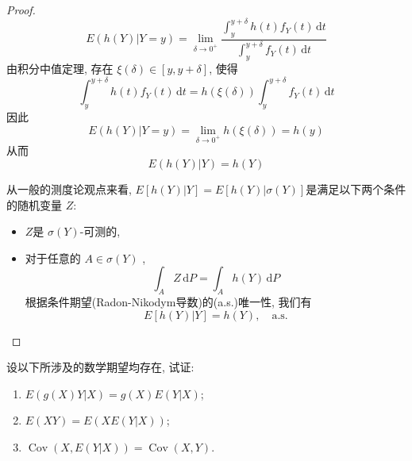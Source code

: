 \documentclass[../main.tex]{subfiles}
\begin{document}
\begin{proof}
  

  \[
  E\left( h\left( Y \right)|Y= y  \right)= \lim_{ \delta \to 0^{+ }} \frac{\int_{y}^{y+  \delta }h\left( t \right)f_{Y}\left( t \right)\,\mathrm{d} t   }{ \int_{y}^{y+  \delta }f_{Y}\left( t \right)\,\mathrm{d} t }  
  \]由积分中值定理, 存在 \(   \xi \left(  \delta \right) \in [y,y+  \delta ]  \), 使得 \[
  \int_{y}^{y+  \delta }h\left( t \right)f_{Y}\left( t \right)\,\mathrm{d} t= h\left(  \xi \left(  \delta  \right)  \right) \int_{y}^{y+  \delta }   f_{Y}\left( t \right)\,\mathrm{d} t 
  \] 因此 \[
  E\left( h\left( Y \right)|Y = y \right)= \lim_{ \delta \to 0^{+ }} h\left(  \xi \left(  \delta  \right)  \right)= h\left( y \right)  
  \]从而 \[
  E\left( h\left( Y \right)|Y  \right)= h\left( Y \right)  
  \]

  \begin{remark}
    从一般的测度论观点来看,  \(  E[h\left( Y \right)| Y ]= E[h\left( Y \right)| \sigma \left( Y \right)  ]  \)是满足以下两个条件的随机变量 \(  Z  \):
     \begin{itemize}
          \item \(  Z  \)是 \(   \sigma \left( Y \right)   \)-可测的, 
          \item  对于任意的 \(  A\in  \sigma \left( Y \right)   \)   , \[
          \int_{A}Z\,\mathrm{d} P= \int_{A}h\left( Y \right)\,\mathrm{d} P 
          \]根据条件期望(Radon-Nikodym导数)的(a.s.)唯一性, 我们有 \[
          E[h\left( Y \right)|Y ]= h\left( Y \right),\quad \text{a.s.} 
          \]
     \end{itemize}
       
  \end{remark}
\end{proof}

\begin{exercise}{}{}
设以下所涉及的数学期望均存在, 试证:
\begin{enumerate}
\item $E(g(X)Y|X) = g(X)E(Y|X)$;
\item $E(XY) = E(XE(Y|X))$;
\item $\operatorname{Cov}(X, E(Y|X)) = \operatorname{Cov}(X, Y)$.
\end{enumerate}
\end{exercise}
\end{document}
